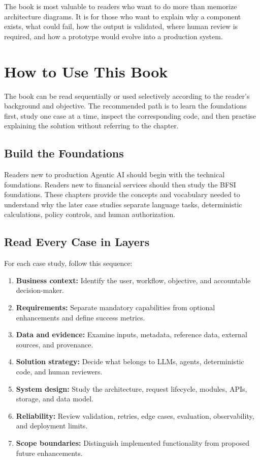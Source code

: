 The book is most valuable to readers who want to do more than memorize architecture diagrams. It is for those who want to explain why a component exists, what could fail, how the output is validated, where human review is required, and how a prototype would evolve into a production system.

\newpage

\section*{How to Use This Book}

The book can be read sequentially or used selectively according to the reader's background and objective. The recommended path is to learn the foundations first, study one case at a time, inspect the corresponding code, and then practise explaining the solution without referring to the chapter.

\subsection*{Build the Foundations}

Readers new to production Agentic AI should begin with the technical foundations. Readers new to financial services should then study the BFSI foundations. These chapters provide the concepts and vocabulary needed to understand why the later case studies separate language tasks, deterministic calculations, policy controls, and human authorization.

\subsection*{Read Every Case in Layers}

For each case study, follow this sequence:

\begin{enumerate}
  \item \textbf{Business context:} Identify the user, workflow, objective, and accountable decision-maker.
  \item \textbf{Requirements:} Separate mandatory capabilities from optional enhancements and define success metrics.
  \item \textbf{Data and evidence:} Examine inputs, metadata, reference data, external sources, and provenance.
  \item \textbf{Solution strategy:} Decide what belongs to LLMs, agents, deterministic code, and human reviewers.
  \item \textbf{System design:} Study the architecture, request lifecycle, modules, APIs, storage, and data model.
  \item \textbf{Reliability:} Review validation, retries, edge cases, evaluation, observability, and deployment limits.
  \item \textbf{Scope boundaries:} Distinguish implemented functionality from proposed future enhancements.
\end{enumerate}

